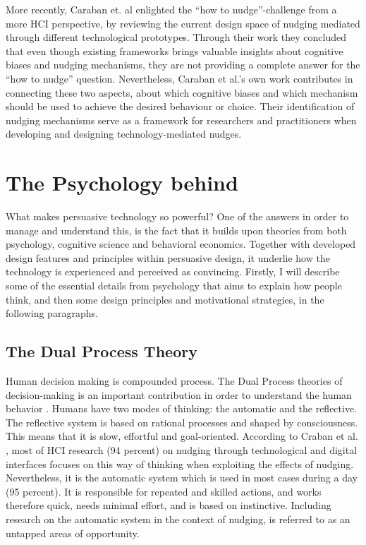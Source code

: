 More recently, Caraban et. al \cite{caraban_23_2019} enlighted the “how to nudge”-challenge from a more HCI perspective, by reviewing the current design space of nudging mediated through different technological prototypes. Through their work they concluded that even though existing frameworks 
brings valuable insights about cognitive biases and nudging mechanisms, they are not providing a complete answer for the “how to nudge” question. Nevertheless, Caraban et al.’s own work contributes in connecting these two aspects, about which cognitive biases and which mechanism should be used to achieve the desired behaviour or choice. Their identification of nudging mechanisms serve as a framework for researchers and practitioners when developing and designing technology-mediated nudges. 

\section{The Psychology behind }
What makes persuasive technology so powerful? One of the answers in order to manage and understand this, is the fact that it builds upon theories from both psychology, cognitive science and behavioral economics. Together with developed design features and principles within persuasive design, it underlie how the technology is experienced and perceived as convincing. Firstly, I will describe some of the essential details from psychology that aims to explain how people think, and then some design principles and motivational strategies, in the following paragraphs. 

\subsection{The Dual Process Theory}
Human decision making is compounded process. The Dual Process theories of decision-making is an important contribution in order to understand the human behavior \cite{caraban_23_2019}.
Humans have two modes of thinking: the automatic and the reflective. The reflective system is based on rational processes and shaped by consciousness. This means that it is slow, effortful and goal-oriented. According to Craban et al. \cite{caraban_23_2019}, most of HCI research (94 percent) on nudging through technological and digital interfaces focuses on this way of thinking when exploiting the effects of nudging. Nevertheless, it is the automatic system which is used in most cases during a day (95 percent). It is responsible for repeated and skilled actions, and works therefore quick, needs minimal effort, and is based on instinctive. Including research on the automatic system in the context of nudging, is referred to as an untapped areas of opportunity.

